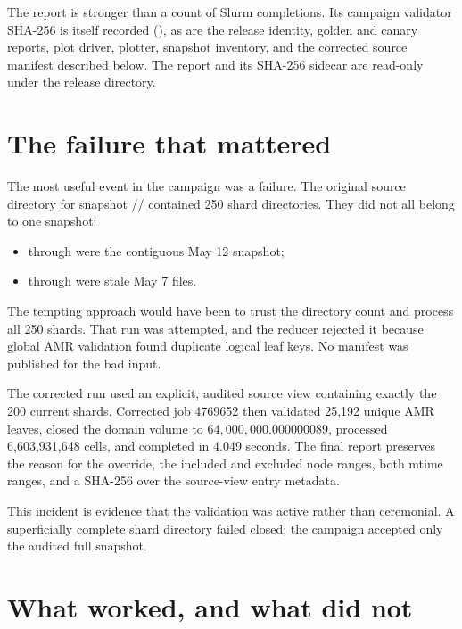 \documentclass[11pt]{article}
\begin{document}
The report is stronger than a count of Slurm completions. Its campaign
validator SHA-256 is itself recorded
(), as are the release identity, golden and
canary reports, plot driver, plotter, snapshot inventory, and the corrected
source manifest described below. The report and its SHA-256 sidecar are
read-only under the release directory.

\section{The failure that mattered}

The most useful event in the campaign was a failure. The original source
directory for snapshot
// contained
250 shard directories. They did not all belong to one snapshot:
\begin{itemize}
  \item {} through  were the
        contiguous May 12 snapshot;
  \item {} through  were stale
        May 7 files.
\end{itemize}

The tempting approach would have been to trust the directory count and process
all 250 shards. That run was attempted, and the reducer rejected it because
global AMR validation found duplicate logical leaf keys. No manifest was
published for the bad input.

The corrected run used an explicit, audited source view containing exactly the
200 current shards. Corrected job 4769652 then validated 25,192 unique AMR
leaves, closed the domain volume to \(64{,}000{,}000.000000089\), processed
6,603,931,648 cells, and completed in 4.049 seconds. The final report preserves
the reason for the override, the included and excluded node ranges, both
mtime ranges, and a SHA-256 over the source-view entry metadata.

\bottomline This incident is evidence that the validation was active rather
than ceremonial. A superficially complete shard directory failed closed; the
campaign accepted only the audited full snapshot.

\section{What worked, and what did not}
\end{document}
